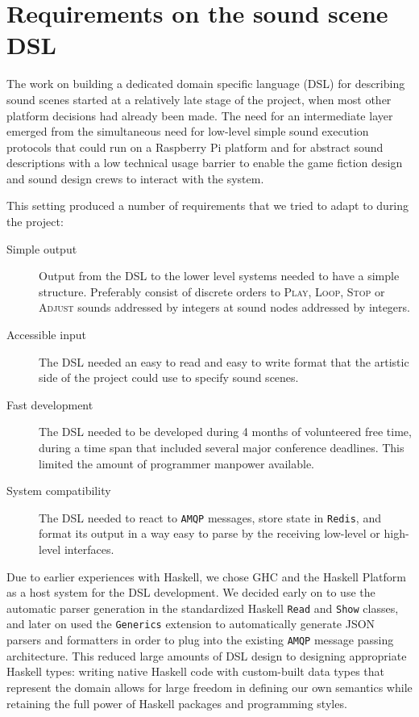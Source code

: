 \section{Requirements on the sound scene DSL}
\label{sec:requ-sound-spec}

The work on building a dedicated domain specific language
(DSL) for describing sound scenes
started at a relatively late stage of the project, when most other
platform decisions had already been made. The need for an intermediate
layer emerged from the simultaneous need for low-level simple sound
execution protocols that could run on a Raspberry Pi platform and for
abstract sound descriptions with a low technical usage barrier to
enable the game fiction design and sound design crews to interact with
the system.

This setting produced a number of requirements that we tried to adapt
to during the project:
\begin{description}
\item[Simple output] Output from the DSL to the lower level systems
  needed to have a simple structure. Preferably consist of discrete
  orders to \textsc{Play}, \textsc{Loop}, \textsc{Stop} or
  \textsc{Adjust} sounds addressed by integers at sound nodes
  addressed by integers.
\item[Accessible input] The DSL needed an easy to read and easy to
  write format that the artistic side of the project could use to
  specify sound scenes.
\item[Fast development] The DSL needed to be developed during 4 months
  of volunteered free time, during a time span that included several
  major conference deadlines. This limited the amount of programmer
  manpower available.
\item[System compatibility] The DSL needed to react to \texttt{AMQP} messages,
  store state in \texttt{Redis}, and format its output in a way easy to parse
  by the receiving low-level or high-level interfaces.
\end{description}

Due to earlier experiences with Haskell, we chose GHC and the Haskell
Platform as a host system for the DSL development. We decided early on
to use the automatic parser generation in the standardized Haskell
\texttt{Read} and \texttt{Show} classes, and later on used the
\texttt{Generics} extension to automatically generate JSON parsers and
formatters in order to plug into the existing \texttt{AMQP} message
passing architecture. This reduced large amounts of DSL design to
designing appropriate Haskell types: writing native Haskell code with
custom-built data types that represent the domain allows for large
freedom in defining our own semantics while retaining the full power
of Haskell packages and programming styles.

